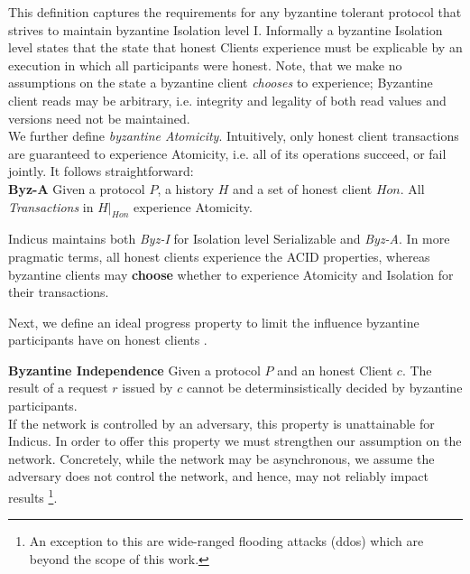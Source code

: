 This definition captures the requirements for any byzantine tolerant protocol that strives to maintain byzantine Isolation level I.
Informally a byzantine Isolation level states that the state that honest Clients experience must be explicable by an execution in which all participants were honest. Note, that we make no assumptions on the state a byzantine client \textit{chooses} to experience; Byzantine client reads may be arbitrary, i.e. integrity and legality of both read values and versions need not be maintained. \\
We further define \textit{byzantine Atomicity}. Intuitively, only honest client transactions are guaranteed to experience Atomicity, i.e. all of its operations succeed, or fail jointly. It follows straightforward:\\
\textbf{Byz-A} Given a protocol $P$, a history $H$ and a set of honest client $Hon$. All \textit{Transactions} in $H|_{Hon}$ experience Atomicity.\\

Indicus maintains both \textit{Byz-I} for Isolation level Serializable and \textit{Byz-A}. 
In more pragmatic terms, all honest clients experience the ACID properties, whereas byzantine clients may \textbf{choose} whether to experience Atomicity and Isolation for their transactions.

Next, we define an ideal progress property to limit the influence byzantine participants have on honest clients . 

\textbf{Byzantine Independence}
Given a protocol $P$ and an honest Client $c$. The result of a request $r$ issued by $c$ cannot be determinsistically decided by byzantine participants.  \\

If the network is controlled by an adversary, this property is unattainable for Indicus. 
In order to offer this property we must strengthen our assumption on the network. Concretely, while the network may be asynchronous, we assume the adversary does not control the network, and hence, may not reliably impact results \footnote{An exception to this are wide-ranged flooding attacks (ddos) which are beyond the scope of this work.}. \\

